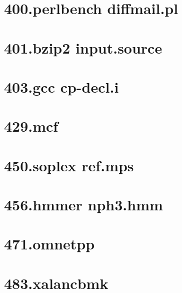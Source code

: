 
\section*{400.perlbench diffmail.pl}
%

\newpage
\section*{401.bzip2 input.source}
%

\newpage
\section*{403.gcc cp-decl.i}
%

\newpage
\section*{429.mcf}
%

\newpage
\section*{450.soplex ref.mps}
%

\newpage
\section*{456.hmmer nph3.hmm}
%

\newpage
\section*{471.omnetpp}
%

\newpage
\section*{483.xalancbmk}
%


